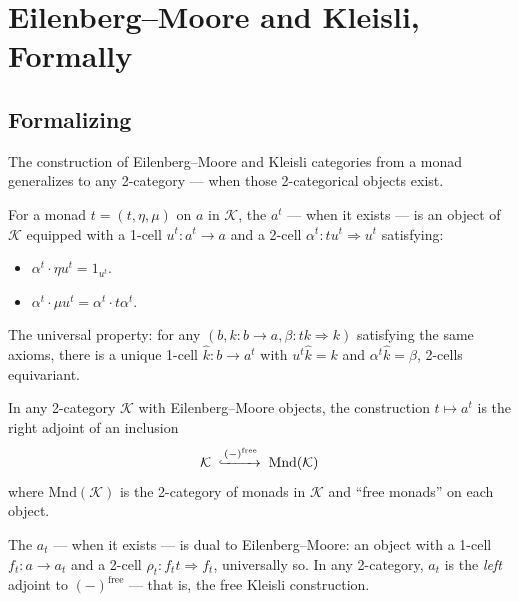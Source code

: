 \section{Eilenberg--Moore and Kleisli, Formally}
\label{sec:formal-em-kleisli}

\subsection{Formalizing}

The construction of Eilenberg--Moore and Kleisli categories from a monad
generalizes to any 2-category — when those 2-categorical objects exist.

\begin{definition}
\label{def:em-object}
For a monad $t = (t, \eta, \mu)$ on $a$ in $\mathcal{K}$, the  $a^t$ — when it exists — is an object of $\mathcal{K}$ equipped with
a 1-cell $u^t : a^t \to a$ and a 2-cell $\alpha^t : t u^t \Rightarrow u^t$
satisfying:
\begin{itemize}
  \item $\alpha^t \cdot \eta u^t = 1_{u^t}$.
  \item $\alpha^t \cdot \mu u^t = \alpha^t \cdot t \alpha^t$.
\end{itemize}
The universal property: for any $(b, k : b \to a, \beta : t k \Rightarrow k)$
satisfying the same axioms, there is a unique 1-cell $\hat k : b \to a^t$
with $u^t \hat k = k$ and $\alpha^t \hat k = \beta$, 2-cells equivariant.
\end{definition}

\begin{theorem}
\label{thm:em-as-right-adjoint}
In any 2-category $\mathcal{K}$ with Eilenberg--Moore objects, the
construction $t \mapsto a^t$ is the right adjoint of an inclusion
\begin{equation*}
  \mathcal{K} \;\xhookrightarrow{(-)^{\mathrm{free}}}\; \mathrm{Mnd}(\mathcal{K})
\end{equation*}
where $\mathrm{Mnd}(\mathcal{K})$ is the 2-category of monads in $\mathcal{K}$
and ``free monads'' on each object.
\end{theorem}

\begin{definition}
\label{def:kleisli-object}
The  $a_t$ — when it exists — is dual to Eilenberg--Moore:
an object with a 1-cell $f_t : a \to a_t$ and a 2-cell $\rho_t : f_t t
\Rightarrow f_t$, universally so. In any 2-category, $a_t$ is the
\emph{left} adjoint to $(-)^{\mathrm{free}}$ — that is, the free Kleisli
construction.
\end{definition}

